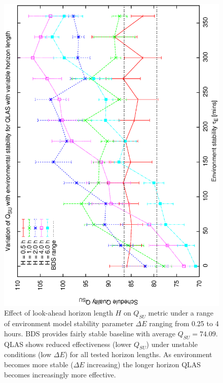 
\begin{figure}[htp]
\begin{center}
  \includegraphics[scale=1.0, angle=0]{figures/horiz_env_su2.eps}
  \caption[Effect of look-ahead horizon length $H$ on $Q_{SU}$ under a range of environmental conditions]
  {Effect of look-ahead horizon length $H$ on $Q_{SU}$  metric under a range of environment model stability parameter $\Delta E$ ranging from 0.25 to 4 hours. BDS provides fairly stable baseline with average $Q_{SU}=74.09$. QLAS shows reduced effectiveness (lower $Q_{SU}$) under unstable conditions (low $\Delta E$) for all tested horizon lengths. As environment becomes more stable ($\Delta E$ increasing) the longer horizon QLAS becomes increasingly more effective.}
\label{fig:hor_denv2}
\end{center}
\end{figure}


